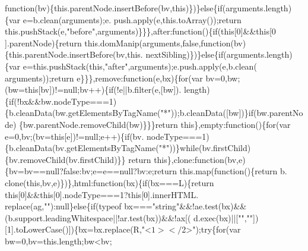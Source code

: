 \begin{DoxyCode}
{      function}(bv)\{this.parentNode.insertBefore(bv,\textcolor{keyword}{this})\})\}\textcolor{keywordflow}{else}\{\textcolor{keywordflow}{if}(arguments.length)\{var e=b.clean(arguments);e.
      push.apply(e,this.toArray());\textcolor{keywordflow}{return} this.pushStack(e,\textcolor{stringliteral}{"before"},arguments)\}\}\},after:\textcolor{keyword}{function}()\{\textcolor{keywordflow}{if}(\textcolor{keyword}{this}[0]&&\textcolor{keyword}{this}[0
      ].parentNode)\{\textcolor{keywordflow}{return} this.domManip(arguments,\textcolor{keyword}{false},\textcolor{keyword}{function}(bv)\{this.parentNode.insertBefore(bv,this.
      nextSibling)\})\}\textcolor{keywordflow}{else}\{\textcolor{keywordflow}{if}(arguments.length)\{var e=this.pushStack(\textcolor{keyword}{this},\textcolor{stringliteral}{"after"},arguments);e.push.apply(e,b.clean(
      arguments));\textcolor{keywordflow}{return} e\}\}\},\textcolor{keyword}{remove}:\textcolor{keyword}{function}(e,bx)\{\textcolor{keywordflow}{for}(var bv=0,bw;(bw=\textcolor{keyword}{this}[bv])!=null;bv++)\{\textcolor{keywordflow}{if}(!e||b.filter(e,[bw]).
      length)\{\textcolor{keywordflow}{if}(!bx&&bw.nodeType===1)\{b.cleanData(bw.getElementsByTagName(\textcolor{stringliteral}{"*"}));b.cleanData([bw])\}\textcolor{keywordflow}{if}(bw.parentNode)
      \{bw.parentNode.removeChild(bw)\}\}\}\textcolor{keywordflow}{return} \textcolor{keyword}{this}\},empty:\textcolor{keyword}{function}()\{\textcolor{keywordflow}{for}(var e=0,bv;(bv=\textcolor{keyword}{this}[e])!=null;e++)\{\textcolor{keywordflow}{if}(bv.
      nodeType===1)\{b.cleanData(bv.getElementsByTagName(\textcolor{stringliteral}{"*"}))\}\textcolor{keywordflow}{while}(bv.firstChild)\{bv.removeChild(bv.firstChild)\}\}\textcolor{keywordflow}{
      return} \textcolor{keyword}{this}\},clone:\textcolor{keyword}{function}(bv,e)\{bv=bv==null?\textcolor{keyword}{false}:bv;e=e==null?bv:e;\textcolor{keywordflow}{return} this.map(\textcolor{keyword}{function}()\{\textcolor{keywordflow}{return} b.
      clone(\textcolor{keyword}{this},bv,e)\})\},html:\textcolor{keyword}{function}(bx)\{\textcolor{keywordflow}{if}(bx===L)\{\textcolor{keywordflow}{return} \textcolor{keyword}{this}[0]&&\textcolor{keyword}{this}[0].nodeType===1?\textcolor{keyword}{this}[0].innerHTML.
      replace(ag,\textcolor{stringliteral}{""}):null\}\textcolor{keywordflow}{else}\{\textcolor{keywordflow}{if}(typeof bx===\textcolor{stringliteral}{"string"}&&!ae.test(bx)&&(b.support.leadingWhitespace||!ar.test(bx))&&!ax[(
      d.exec(bx)||[\textcolor{stringliteral}{""},\textcolor{stringliteral}{""}])[1].toLowerCase()])\{bx=bx.replace(R,\textcolor{stringliteral}{"<$1></$2>"});\textcolor{keywordflow}{try}\{\textcolor{keywordflow}{for}(var bw=0,bv=this.length;bw<bv;

\end{DoxyCode}
